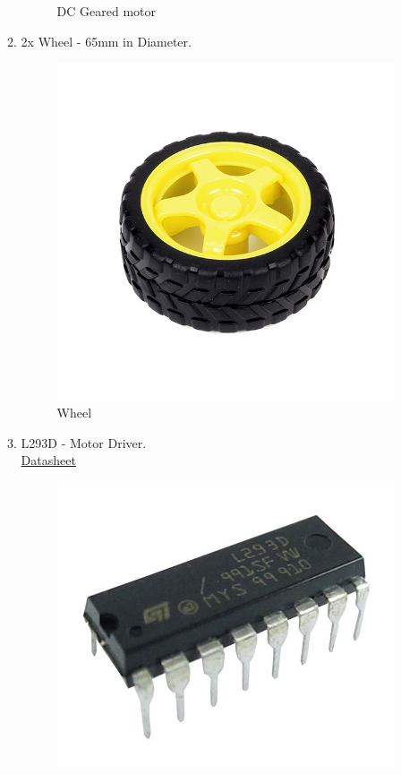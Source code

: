 \documentclass[a4paper,12pt,oneside]{book}
\begin{document}
\begin{itemize}
\begin{enumerate}
\begin{figure}[!ht]
        \caption{DC Geared motor}
      \end{figure}

    \item 2x Wheel - 65mm in Diameter.
    \begin{figure}[h]
        \centering
        \includegraphics[scale=0.22]{wheel}
        \caption{Wheel}
      \end{figure}
    \item L293D - Motor Driver.\\
    \href{http://www.engineersgarage.com/sites/default/files/L293D.pdf}{ Datasheet}\par
   \begin{figure}[!ht]
        \centering
        \includegraphics[scale=0.2]{l293d}

\end{figure}
\end{enumerate}
\end{itemize}
\end{document}
